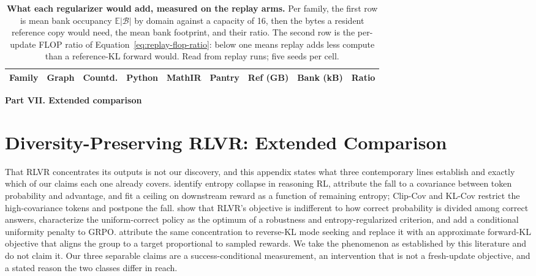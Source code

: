 \documentclass{article}
\newcommand{\1}{\mathbf 1}
\newcommand{\E}{\mathbb E}
\theoremstyle{remark}
\theoremstyle{definition}
\theoremstyle{plain}
\begin{document}
\begin{table}[t]
  \centering
  \caption{\textbf{What each regularizer would add, measured on the replay
  arms.} Per family, the first row is mean bank occupancy $\E|\mathcal B|$ by
  domain against a capacity of 16, then the bytes a resident reference copy
  would need, the mean bank footprint, and their ratio. The second row is the
  per-update FLOP ratio of Equation~\eqref{eq:replay-flop-ratio}: below one
  means replay adds less compute than a reference-KL forward would. Read from
  \MDcostRuns{} replay runs; five seeds per cell.}
  \label{tab:replay-cost}
  \scriptsize
  \setlength{\tabcolsep}{4.2pt}
  \begin{tabular}{@{}lrrrrrrrr@{}}
    \toprule
    \textbf{Family} & \textbf{Graph} & \textbf{Countd.} & \textbf{Python}
      & \textbf{MathIR} & \textbf{Pantry} & \textbf{Ref (GB)}
      & \textbf{Bank (kB)} & \textbf{Ratio} \\
    \midrule
    
  \end{tabular}
\end{table}

\clearpage
{}
\begin{center}\large\textbf{Part VII. Extended comparison}\end{center}

\section{Diversity-Preserving RLVR: Extended Comparison}
\label{app:related-extended}

That RLVR concentrates its outputs is not our discovery, and this appendix
states what three contemporary lines establish and exactly which of our claims
each one already covers.
\citet{cui2025entropy} identify entropy collapse in reasoning RL, attribute the
fall to a covariance between token probability and advantage, and fit a ceiling
on downstream reward as a function of remaining entropy; Clip-Cov and KL-Cov
restrict the high-covariance tokens and postpone the fall.
\citet{lochab2026ucpo} show that RLVR's objective is indifferent to how correct
probability is divided among correct answers, characterize the uniform-correct
policy as the optimum of a robustness and entropy-regularized criterion, and
add a conditional uniformity penalty to GRPO.
\citet{li2026distribution} attribute the same concentration to reverse-KL
mode seeking and replace it with an approximate forward-KL objective that
aligns the group to a target proportional to sampled rewards.
We take the phenomenon as established by this literature and do not claim it.
Our three separable claims are a success-conditional measurement, an
intervention that is not a fresh-update objective, and a stated reason the two
classes differ in reach.
\end{document}

